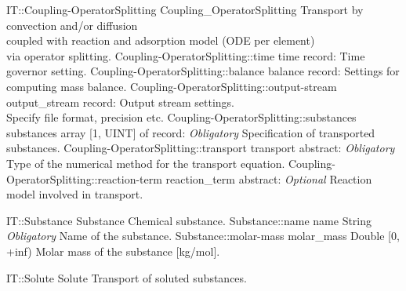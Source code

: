 \begin{RecordType}
	{IT::Coupling-OperatorSplitting}
	{Coupling{\_}OperatorSplitting}
	{}%
	{}%
	{{{Transport by convection and/or diffusion}\\{
coupled with reaction and adsorption model (ODE per element)}\\{
 via operator splitting.}%
}}
		\RecKey
			{Coupling-OperatorSplitting::time}
			{time}
			{{record: }}{}
			{ \ValueDefault{{\{}{\}}}}
			{{{Time governor setting.}%
}}
		\RecKey
			{Coupling-OperatorSplitting::balance}
			{balance}
			{{record: }}{}
			{ \ValueDefault{{\{}{\}}}}
			{{{Settings for computing mass balance.}%
}}
		\RecKey
			{Coupling-OperatorSplitting::output-stream}
			{output{\_}stream}
			{{record: }}{}
			{ \ValueDefault{{\{}{\}}}}
			{{{Output stream settings.}\\{
 Specify file format, precision etc.}%
}}
		\RecKey
			{Coupling-OperatorSplitting::substances}
			{substances}
			{{array [1, UINT] of }{record: }}{}
			{ \it{Obligatory}}
			{{{Specification of transported substances.}%
}}
		\RecKey
			{Coupling-OperatorSplitting::transport}
			{transport}
			{{abstract: }}{}
			{ \it{Obligatory}}
			{{{Type of the numerical method for the transport equation.}%
}}
		\RecKey
			{Coupling-OperatorSplitting::reaction-term}
			{reaction{\_}term}
			{{abstract: }}{}
			{ \it{Optional}}
			{{{Reaction model involved in transport.}%
}}
\end{RecordType}
\begin{RecordType}
	{IT::Substance}
	{Substance}
	{}%
	{}%
	{{{Chemical substance.}%
}}
		\RecKey
			{Substance::name}
			{name}
			{{String}}{}
			{ \it{Obligatory}}
			{{{Name of the substance.}%
}}
		\RecKey
			{Substance::molar-mass}
			{molar{\_}mass}
			{{Double [0, +inf)}}{}
			{ }
			{{{Molar mass of the substance [kg/mol].}%
}}
\end{RecordType}
\begin{AbstractType}
	{IT::Solute}
	{Solute}
	{}
	{{{Transport of soluted  substances.}%
}}
\end{AbstractType}
